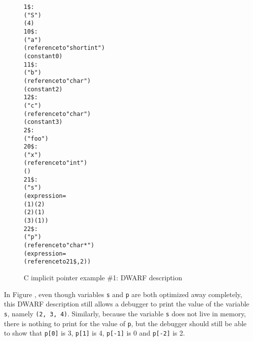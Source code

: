 \begin{figure}[h]
\begin{dwflisting}
\begin{alltt}
1\$: \DWTAGstructuretype
        \DWATname("S")
        \DWATbytesize(4)
10\$:    \DWTAGmember
            \DWATname("a")
            \DWATtype(reference to "short int")
            \DWATdatamemberlocation(constant 0)
11\$:    \DWTAGmember
            \DWATname("b")
            \DWATtype(reference to "char")
            \DWATdatamemberlocation(constant 2)
12\$:    \DWTAGmember
            \DWATname("c")
            \DWATtype(reference to "char")
            \DWATdatamemberlocation(constant 3)
2\$: \DWTAGsubprogram
        \DWATname("foo")
20\$:    \DWTAGformalparameter
            \DWATname("x")
            \DWATtype(reference to "int")
            \DWATlocation(\DWOPregfive)
21\$:    \DWTAGvariable
            \DWATname("s")
            \DWATlocation(expression=
                \DWOPbregfive(1) \DWOPstackvalue \DWOPpiece(2)
                \DWOPbregfive(2) \DWOPstackvalue \DWOPpiece(1)
                \DWOPbregfive(3) \DWOPstackvalue \DWOPpiece(1))
22\$:    \DWTAGvariable
            \DWATname("p")
            \DWATtype(reference to "char *")
            \DWATlocation(expression=
                \DWOPimplicitpointer(reference to 21\$, 2))
\end{alltt}
\end{dwflisting}
\caption{C implicit pointer example \#1: DWARF description}
\label{fig:cimplicitpointerexample1dwarf}
\end{figure}

In Figure ,
even though variables \texttt{s} and \texttt{p} are both optimized 
away completely, this DWARF description still allows a debugger to 
print the value of the variable \texttt{s}, namely \texttt{(2, 3, 4)}. 
Similarly, because the variable \texttt{s} does not live in
memory, there is nothing to print for the value of \texttt{p}, but the 
debugger should still be able to show that \texttt{p[0]} is 3, 
\texttt{p[1]} is 4, \texttt{p[-1]} is 0 and \texttt{p[-2]} is 2.

